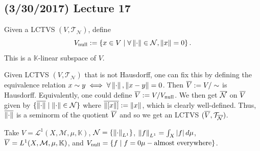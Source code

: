 \documentclass[11pt,leqno,oneside]{amsbook}
\numberwithin{thm}{section}
\newcommand{\M}{\mathcal{M}}
\newcommand{\Top}{\mathcal{T}} %
\newcommand{\cL}{\mathcal{L}}
\newcommand{\cN}{\mathcal{N}}
\newcommand{\norms}{\cN}
\begin{document}
\subsection*{(3/30/2017) Lecture 17}
\begin{defn}
  Given a LCTVS \((V,\Top_\norms)\), define \[
    V_{\text{null}} := \left\{ x \in V \st \forall \norm \in \norms,
      \norm[x] = 0 \right\}.
  \]
  This is a \(\mathbb{K}\)-linear subspace of \(V\).
\end{defn}
\begin{rmk}
  Given LCTVS \((V,\Top_\norms)\)  that is not Hausdorff, one can fix
  this by defining the equivalence relation \(x \sim y \iff \forall
  \norm, \norm[x-y] = 0\). Then \(\ov{V} := V/\sim\) is
  Hausdorff. Equivalently, one could define \(\ov{V} :=
  V/V_{\text{null}}\). We then get \(\ov{\norms}\) on \(\ov{V}\) given
  by \(\{\ov{\norm} \st \norm \in \norms\}\) where \(\ov{\norm[[x]]}
  := \norm[x]\), which is clearly well-defined. Thus, \(\ov{\norm}\)
  is a seminorm of the quotient \(\ov{V}\) and so we get an LCTVS
  \((\ov{V}, \Top_{\ov{\norms}})\).
\end{rmk}
\begin{example}
  Take \(V = \cL^1(X,\M,\mu,\mathbb{K})\), \(\norms =
  \{\norm_{L^1}\}\), \(\norm[f]_{L^1} = \int_X |f|\d\mu\), \(\ov{V} =
  L^1(X,\M,\mu,\mathbb{K})\), and \(V_\text{null} = \{f \st f=0
  \mu-\text{almost everywhere}\}\).
\end{example}
\end{document}
